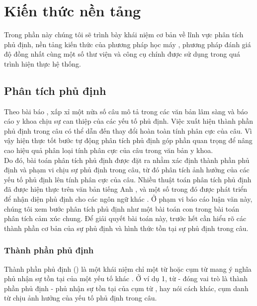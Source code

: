 \section{Kiến thức nền tảng}
Trong phần này chúng tôi sẽ trình bày khái niệm cơ bản về lĩnh vực phân tích phủ định, nền tảng kiến thức của phương pháp học máy , phương pháp đánh giá độ đồng nhất  cùng một số thư viện và công cụ chính được sử dụng trong quá trình hiện thực hệ thống.
\subsection{Phân tích phủ định}
Theo bài báo \cite{chapman2001evaluation}, xấp xỉ một nửa số câu mô tả trong các văn bản lâm sàng và báo cáo y khoa chịu sự can thiệp của các yếu tố phủ định. Việc xuất hiện thành phần phủ định trong câu có thể dẫn đến thay đổi hoàn toàn tính phân cực của câu. Vì vậy hiện thực tốt bước tự động phân tích phủ định góp phần quan trọng để nâng cao hiệu quả phân loại tính phân cực của câu trong văn bản y khoa.\\

Do đó, bài toán phân tích phủ định được đặt ra nhằm xác định thành phần phủ định và phạm vi chịu sự phủ định trong câu, từ đó phân tích ảnh hưởng của các yếu tố phủ định lên tính phân cực của câu. Nhiều thuật toán phân tích phủ định đã được hiện thực trên văn bản tiếng Anh \cite{Aronow1999, chapman2001evaluation, Mutalik2001, Elkin2005, Zeng2007}, và một số trong đó được phát triển để nhận diện phủ định cho các ngôn ngữ khác \cite{benamara2012how, costumero2014an, Chapman2013, CruzDiaz2015, gindl2006negation}. Ở phạm vi báo cáo luận văn này, chúng tôi xem bước phân tích phủ định như một bài toán con trong bài toán phân tích cảm xúc chung. Để giải quyết bài toán này, trước hết cần hiểu rõ các thành phần cơ bản của sự phủ định và hình thức tồn tại sự phủ định trong câu.

\subsubsection*{Thành phần phủ định}
Thành phần phủ định () là một khái niệm chỉ một từ hoặc cụm từ mang ý nghĩa phủ nhận sự tồn tại của một yếu tố khác \cite{skeppstedt2016marker}. Ở ví dụ 1, từ  - đóng vai trò là thành phần phủ định - phủ nhận sự tồn tại của cụm từ , hay nói cách khác, cụm danh từ  chịu ảnh hưởng của yếu tố phủ định trong câu. \\

